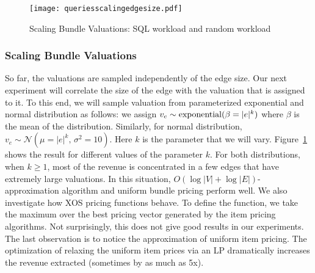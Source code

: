 \begin{figure}[!t]
	\centering
	\texttt{[image: queriesscalingedgesize.pdf]}
	\caption{Scaling Bundle Valuations: SQL workload and random workload} \label{fig:scalingedge}
\end{figure}  

\subsubsection{Scaling Bundle Valuations} So far, the valuations are sampled independently of the edge size. Our next experiment will correlate the size of the edge with the valuation that is assigned to it. To this end, we will sample valuation from parameterized exponential and normal distribution as follows: we assign $v_e \sim {\rm exponential}(\beta = |e|^k)$ where $\beta$ is the mean of the distribution. Similarly, for normal distribution, $v_e \sim \mathcal{N}(\mu = |e|^k,\, \sigma^2 = 10)$. Here $k$ is the parameter that we will vary. Figure~\ref{fig:scalingedge} shows the result for different values of the parameter $k$. For both distributions, when $k \geq 1$, most of the revenue is concentrated in a few edges that have extremely large valuations. In this situation, $O(\log |V| + \log |E|)$-approximation algorithm and uniform bundle pricing perform well. We also investigate how XOS pricing functions behave. To define the function, we take the maximum over the best pricing vector generated by the item pricing algorithms. Not surprisingly, this does not give good results in our experiments. The last observation is to notice the approximation of uniform item pricing. The optimization of relaxing the uniform item prices via an LP dramatically increases the revenue extracted (sometimes by as much as 5x).

